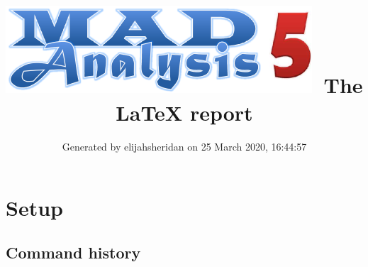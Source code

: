 \documentclass[a4paper, 10pt]{article}
\title{{\includegraphics[scale=.4]{logo.png}}\ The LaTeX report}
\author{Generated by elijahsheridan on 25 March 2020, 16:44:57}
\begin{document}
\maketitle
\flushbottom

\newpage
\section{ Setup}

\subsection{ Command history}
\end{document}

